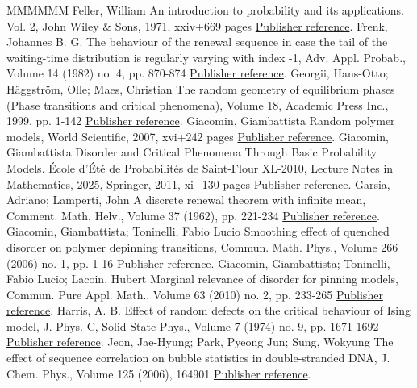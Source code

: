 \begin{thebibliography}{MMMMMM}
 Feller, William An introduction to probability and its applications. Vol. 2, John Wiley \& Sons, 1971, xxiv+669 pages \href{https://ahl.centre-mersenne.org/item/AHL_2019__2__281_0/#Feller71}{Publisher reference}.
 Frenk, Johannes B. G. The behaviour of the renewal sequence in case the tail of the waiting-time distribution is regularly varying with index -1, Adv. Appl. Probab., Volume 14 (1982) no. 4, pp. 870-874 \href{https://ahl.centre-mersenne.org/item/AHL_2019__2__281_0/#Fr82}{Publisher reference}.
 Georgii, Hans-Otto; Häggström, Olle; Maes, Christian The random geometry of equilibrium phases (Phase transitions and critical phenomena), Volume 18, Academic Press Inc., 1999, pp. 1-142 \href{https://ahl.centre-mersenne.org/item/AHL_2019__2__281_0/#GHM1999}{Publisher reference}.
 Giacomin, Giambattista Random polymer models, World Scientific, 2007, xvi+242 pages \href{https://ahl.centre-mersenne.org/item/AHL_2019__2__281_0/#Gi2007}{Publisher reference}.
 Giacomin, Giambattista Disorder and Critical Phenomena Through Basic Probability Models. École d’Été de Probabilités de Saint-Flour XL-2010, Lecture Notes in Mathematics, 2025, Springer, 2011, xi+130 pages \href{https://ahl.centre-mersenne.org/item/AHL_2019__2__281_0/#Gi2011}{Publisher reference}.
 Garsia, Adriano; Lamperti, John A discrete renewal theorem with infinite mean, Comment. Math. Helv., Volume 37 (1962), pp. 221-234 \href{https://ahl.centre-mersenne.org/item/AHL_2019__2__281_0/#GL63}{Publisher reference}.
 Giacomin, Giambattista; Toninelli, Fabio Lucio Smoothing effect of quenched disorder on polymer depinning transitions, Commun. Math. Phys., Volume 266 (2006) no. 1, pp. 1-16 \href{https://ahl.centre-mersenne.org/item/AHL_2019__2__281_0/#GiT2006}{Publisher reference}.
 Giacomin, Giambattista; Toninelli, Fabio Lucio; Lacoin, Hubert Marginal relevance of disorder for pinning models, Commun. Pure Appl. Math., Volume 63 (2010) no. 2, pp. 233-265 \href{https://ahl.centre-mersenne.org/item/AHL_2019__2__281_0/#GTL09}{Publisher reference}.
 Harris, A. B. Effect of random defects on the critical behaviour of Ising model, J. Phys. C, Solid State Phys., Volume 7 (1974) no. 9, pp. 1671-1692 \href{https://ahl.centre-mersenne.org/item/AHL_2019__2__281_0/#H74}{Publisher reference}.
 Jeon, Jae-Hyung; Park, Pyeong Jun; Sung, Wokyung The effect of sequence correlation on bubble statistics in double-stranded DNA, J. Chem. Phys., Volume 125 (2006), 164901 \href{https://ahl.centre-mersenne.org/item/AHL_2019__2__281_0/#JPS06}{Publisher reference}.

\end{thebibliography}
